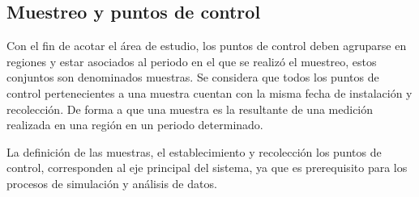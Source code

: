 \subsection{Muestreo y puntos de control}
Con el fin de acotar el área de estudio, los puntos de control deben agruparse en regiones y estar
asociados al periodo en el que se realizó el muestreo, estos conjuntos son denominados muestras. Se
considera que todos los puntos de control pertenecientes a una muestra cuentan con la misma fecha
de instalación y recolección. De forma a que una muestra es la resultante de una medición realizada
en una región en un periodo determinado.

La definición de las muestras, el establecimiento y recolección los puntos de control,
corresponden al eje principal del sistema, ya que es prerequisito para los procesos de simulación
y análisis de datos.

